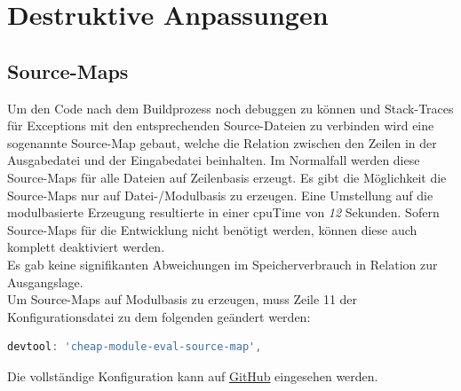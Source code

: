 \documentclass[11pt]{report}
\begin{document}

    	\section{Destruktive Anpassungen}
    		\subsection{Source-Maps}
    			Um den Code nach dem Buildprozess noch debuggen zu können und Stack-Traces für Exceptions mit den entsprechenden Source-Dateien zu verbinden wird eine sogenannte Source-Map gebaut, welche die Relation zwischen den Zeilen in der Ausgabedatei und der Eingabedatei beinhalten. Im Normalfall werden diese Source-Maps für alle Dateien auf Zeilenbasis erzeugt. Es gibt die Möglichkeit die Source-Maps nur auf Datei-/Modulbasis zu erzeugen. Eine Umstellung auf die modulbasierte Erzeugung resultierte in einer \Gls{cpuTime} von \emph{12} Sekunden. Sofern Source-Maps für die Entwicklung nicht benötigt werden, können diese auch komplett deaktiviert werden.\\
    			Es gab keine signifikanten Abweichungen im Speicherverbrauch in Relation zur Ausgangslage.\\
    			Um Source-Maps auf Modulbasis zu erzeugen, muss Zeile 11 der Konfigurationsdatei zu dem folgenden geändert werden:
    			\begin{center}
		        	\lstset{%
					    caption=Caching,
						basicstyle=\footnotesize,
						xleftmargin=.15\textwidth,
						xrightmargin=.15\textwidth,
						numbers=none
					}
		        	\begin{lstlisting}[language=JavaScript]
		        		devtool: 'cheap-module-eval-source-map',
		        	\end{lstlisting}
	        	\end{center}  
    			Die vollständige Konfiguration kann auf \href{https://github.com/TexNAK/WebBundlerOptimization/compare/master...destr_cheapSourceMaps#diff-1fb5683b1e7adbcee273b7f9f9a08a22}{GitHub} eingesehen werden.

\end{document}
